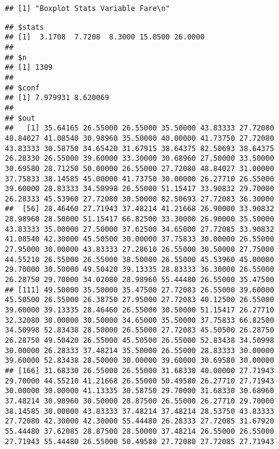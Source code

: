\documentclass[
]{article}
\newenvironment{Shaded}{\begin{snugshade}}{\end{snugshade}}
\newcommand{\DataTypeTok}[1]{\textcolor[rgb]{0.13,0.29,0.53}{#1}}
\newcommand{\FloatTok}[1]{\textcolor[rgb]{0.00,0.00,0.81}{#1}}
\newcommand{\KeywordTok}[1]{\textcolor[rgb]{0.13,0.29,0.53}{\textbf{#1}}}
\newcommand{\NormalTok}[1]{#1}
\newcommand{\OperatorTok}[1]{\textcolor[rgb]{0.81,0.36,0.00}{\textbf{#1}}}
\newcommand{\OtherTok}[1]{\textcolor[rgb]{0.56,0.35,0.01}{#1}}
\begin{document}
\begin{verbatim}
## [1] "Boxplot Stats Variable Fare\n"
\end{verbatim}

\begin{Shaded}
\end{Shaded}

\begin{verbatim}
## $stats
## [1]  3.1708  7.7208  8.3000 15.0500 26.0000
## 
## $n
## [1] 1309
## 
## $conf
## [1] 7.979931 8.620069
## 
## $out
##   [1] 35.64165 26.55000 26.55000 35.50000 43.83333 27.72080 48.84027 41.08540 30.98960 35.50000 40.00000 41.73750 27.72080 43.83333 30.58750 34.65420 31.67915 38.64375 82.50693 38.64375 26.28330 26.55000 39.60000 33.30000 30.68960 27.50000 33.50000 30.69580 28.71250 50.00000 26.55000 27.72080 48.84027 31.00000 37.75833 38.14585 45.00000 41.73750 30.00000 26.27710 26.55000 39.60000 28.83333 34.50998 26.55000 51.15417 33.90832 29.70000 26.28333 45.53960 27.72080 30.50000 82.50693 27.72083 36.30000
##  [56] 28.46460 27.71943 37.48214 41.21668 26.90000 33.90832 28.98960 28.50000 51.15417 66.82500 33.30000 26.90000 35.50000 43.83333 35.00000 27.50000 37.62500 34.65000 27.72085 33.90832 41.08540 42.30000 45.50500 30.00000 37.75833 30.00000 26.55000 27.95000 30.00000 43.83333 27.28610 26.55000 30.50000 27.75000 44.55210 26.55000 26.55000 38.50000 26.55000 45.53960 45.00000 29.70000 30.50000 49.50420 39.13335 28.83333 36.30000 26.55000 26.28750 29.70000 34.02080 28.98960 55.44480 26.55000 35.47500
## [111] 49.50000 35.50000 35.47500 27.72083 26.55000 39.60000 45.50500 26.55000 26.38750 27.95000 27.72083 40.12500 26.55000 39.60000 39.13335 28.46460 26.55000 30.50000 51.15417 26.27710 32.32080 30.00000 30.50000 34.65000 35.50000 37.75833 66.82500 34.50998 52.83438 28.50000 26.55000 27.72083 45.50500 26.28750 26.28750 49.50420 26.55000 45.50500 26.55000 52.83438 34.50998 30.00000 26.28333 37.48214 35.50000 26.55000 28.83333 30.00000 39.60000 52.83438 28.50000 30.00000 39.60000 30.69580 30.00000
## [166] 31.68330 26.55000 26.55000 31.68330 40.00000 27.71943 29.70000 44.55210 41.21668 26.55000 50.49580 26.27710 27.71943 30.00000 30.00000 41.13335 30.58750 29.70000 31.68330 30.68960 37.48214 30.98960 30.50000 28.87500 26.55000 26.27710 29.70000 38.14585 30.00000 43.83333 37.48214 37.48214 28.53750 43.83333 27.72080 42.30000 42.30000 55.44480 26.28333 27.72085 31.67920 55.44480 37.62085 28.87500 28.50000 37.48214 26.55000 26.55000 27.71943 55.44480 26.55000 50.49580 27.72080 27.72085 27.71943

\end{verbatim}
\end{document}
